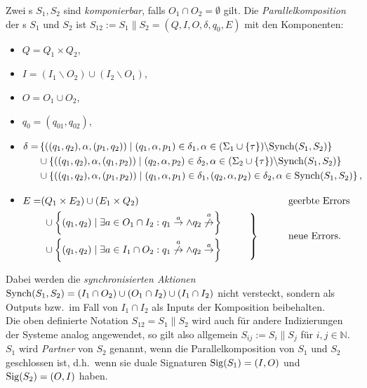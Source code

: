 \begin{Def}[Parallelkomposition]
\label{DefParallelkomposition}
  Zwei \EIO{}s $S_1, S_2$ sind \emph{komponierbar}, falls
  $O_1\cap O_2=\emptyset$ gilt. Die \emph{Parallelkomposition} der \EIO{}s
  $S_1$ und $S_2$ ist
  $S_{12}:=S_1\|S_2=(Q,I,O,\delta ,q_0,E)$ mit den Komponenten:
  \begin{itemize}
    \item $Q=Q_1\times Q_2$,
    \item $I=(I_1\backslash O_2)\cup(I_2\backslash O_1)$,
    \item $O=O_1\cup O_2$,
    \item $q_0=(q_{01},q_{02})$,
    \item $\begin{aligned}[t]
    \delta =&\left\{((q_1,q_2),\alpha ,(p_1,q_2))\mid (q_1,\alpha ,p_1)\in\delta
      _1,\alpha\in(\Sigma _1\cup\{\tau\})\backslash \mathrm{Synch}(S_1,S_2)\right\}\\
      &\cup\left\{((q_1,q_2),\alpha ,(q_1,p_2))\mid (q_2,\alpha ,p_2)\in\delta
      _2,\alpha\in(\Sigma _2\cup\{\tau\})\backslash \mathrm{Synch}(S_1,S_2)\right\}\\
      &\cup\left\{((q_1,q_2),\alpha ,(p_1,p_2))\mid (q_1,\alpha ,p_1)\in\delta
      _1, (q_2,\alpha ,p_2)\in\delta _2, \alpha\in \mathrm{Synch}(S_1,S_2)\right\},
  \end{aligned}$
    \item $\begin{aligned}[t]
        E=&(Q_1\times E_2)\cup (E_1\times Q_2)
        &&\phantom{neue}\mathrm{geerbte}~\mathrm{Errors}\\
        &\left.\begin{aligned}
        &\cup\left\{(q_1,q_2)\mid \exists a\in O_1\cap I_2: q_1\overset{a}{\rightarrow}\wedge
      q_2\overset{a}{\not{\hspace{-0.1cm}\rightarrow}}\right\}\\
      &\cup\left\{(q_1,q_2)\mid \exists a\in I_1\cap O_2:
q_1\overset{a}{\not{\hspace{-0.1cm}\rightarrow}}\wedge
q_2\overset{a}{\rightarrow}\right\}
\end{aligned}\hspace{1cm}\right\}
      &&\phantom{neue}\mathrm{neue}~\mathrm{Errors}.\\
  \end{aligned}$
  \end{itemize}
  Dabei werden die \emph{synchronisierten Aktionen} $\mathrm{Synch}(S_1,
  S_2)=(I_1\cap O_2)\cup(O_1\cap I_2)\cup (I_1\cap I_2)$ nicht versteckt,
  sondern als Outputs bzw.\ im Fall von $I_1\cap I_2$ als Inputs der
  Komposition beibehalten.\\
  Die oben definierte Notation $S_{12}=S_1\|S_2$ wird auch für andere
  Indizierungen der Systeme analog angewendet, so gilt also allgemein
  $S_{ij}:=S_i\|S_j$ für $i,j\in\mathbb{N}$.\\
  $S_1$ wird \emph{Partner} von $S_2$ genannt, wenn die Parallelkomposition von
  $S_1$ und $S_2$ geschlossen ist, d.h.\ wenn sie duale Signaturen
  $\mathrm{Sig}(S_1)=(I,O)$ und $\mathrm{Sig}(S_2)=(O,I)$ haben.
\end{Def}

